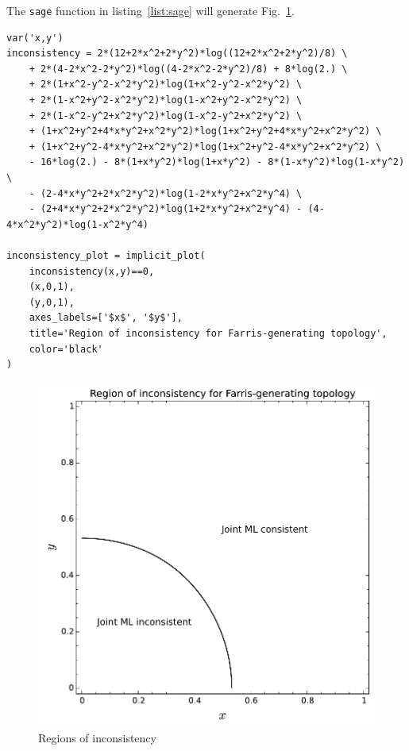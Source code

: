 \documentclass[a4paper]{article}
\begin{document}
The \texttt{sage} function in listing~\ref{list:sage} will generate Fig.~\ref{fig:inconsistency-farris}.

\begin{table}
    \begin{center}
\begin{verbatim}
var('x,y')
inconsistency = 2*(12+2*x^2+2*y^2)*log((12+2*x^2+2*y^2)/8) \
    + 2*(4-2*x^2-2*y^2)*log((4-2*x^2-2*y^2)/8) + 8*log(2.) \
    + 2*(1+x^2-y^2-x^2*y^2)*log(1+x^2-y^2-x^2*y^2) \
    + 2*(1-x^2+y^2-x^2*y^2)*log(1-x^2+y^2-x^2*y^2) \
    + 2*(1-x^2-y^2+x^2*y^2)*log(1-x^2-y^2+x^2*y^2) \
    + (1+x^2+y^2+4*x*y^2+x^2*y^2)*log(1+x^2+y^2+4*x*y^2+x^2*y^2) \
    + (1+x^2+y^2-4*x*y^2+x^2*y^2)*log(1+x^2+y^2-4*x*y^2+x^2*y^2) \
    - 16*log(2.) - 8*(1+x*y^2)*log(1+x*y^2) - 8*(1-x*y^2)*log(1-x*y^2) \
    - (2-4*x*y^2+2*x^2*y^2)*log(1-2*x*y^2+x^2*y^4) \
    - (2+4*x*y^2+2*x^2*y^2)*log(1+2*x*y^2+x^2*y^4) - (4-4*x^2*y^2)*log(1-x^2*y^4)

inconsistency_plot = implicit_plot(
    inconsistency(x,y)==0,
    (x,0,1),
    (y,0,1),
    axes_labels=['$x$', '$y$'],
    title='Region of inconsistency for Farris-generating topology',
    color='black'
)
\end{verbatim}
    \end{center}
\caption{Sage code to generate Fig.~\ref{fig:inconsistency-farris}}
\label{list:sage}
\end{table}

\begin{figure}
\centering
\includegraphics[width=.9\textwidth]{analytic-inconsistency}
\caption{Regions of inconsistency}
\label{fig:inconsistency-farris}
\end{figure}
\end{document}
